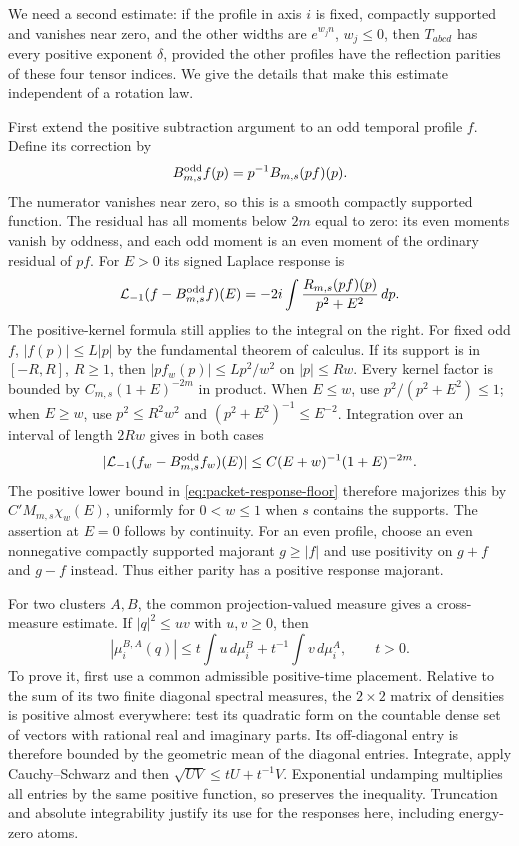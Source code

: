 We need a second estimate: if the profile in axis $i$ is fixed, compactly
supported and vanishes near zero, and the other widths are $e^{w_jn}$,
$w_j\leq0$, then $T_{abcd}$ has every positive exponent $\delta$, provided
the other profiles have the reflection parities of these four tensor indices.
We give the details that make this estimate independent of a rotation law.

First extend the positive subtraction argument to an odd temporal profile
$f$. Define its correction by
\[
 B^{\rm odd}_{m,s}f(p)=p^{-1}B_{m,s}(pf)(p).
\]
The numerator vanishes near zero, so this is a smooth compactly supported
function. The residual has all moments below $2m$ equal to zero: its even
moments vanish by oddness, and each odd moment is an even moment of the
ordinary residual of $pf$. For $E>0$ its signed Laplace response is
\[
 \mathcal L_{-1}(f-B^{\rm odd}_{m,s}f)(E)
       =-2i\int\frac{R_{m,s}(pf)(p)}{p^2+E^2}\,dp.
\]
The positive-kernel formula still applies to the integral on the right.
For fixed odd $f$, $|f(p)|\leq L|p|$ by the fundamental theorem of
calculus. If its support is in $[-R,R]$, $R\geq1$, then
$|p f_w(p)|\leq Lp^2/w^2$ on $|p|\leq Rw$.
Every kernel factor is bounded by
$C_{m,s}(1+E)^{-2m}$ in product. When $E\leq w$, use
$p^2/(p^2+E^2)\leq1$; when $E\geq w$, use
$p^2\leq R^2w^2$ and $(p^2+E^2)^{-1}\leq E^{-2}$.
Integration over an interval of length $2Rw$ gives in both cases
\[
 |\mathcal L_{-1}(f_w-B^{\rm odd}_{m,s}f_w)(E)|
 \leq C(E+w)^{-1}(1+E)^{-2m}.
\]
The positive lower bound in \eqref{eq:packet-response-floor} therefore
majorizes this by $C'M_{m,s}\chi_w(E)$, uniformly for $0<w\leq1$ when
$s$ contains the supports. The assertion at $E=0$ follows by continuity.
For an even profile, choose an even nonnegative compactly supported
majorant $g\geq|f|$ and use positivity on $g+f$ and $g-f$ instead.
Thus either parity has a positive response majorant.

For two clusters $A,B$, the common projection-valued measure gives a
cross-measure estimate. If $|q|^2\leq uv$ with $u,v\geq0$, then
\begin{equation}\label{eq:stress-cross-price}
 |\mu_i^{B,A}(q)|\leq t\int u\,d\mu_i^B
                       +t^{-1}\int v\,d\mu_i^A,\qquad t>0.
\end{equation}
To prove it, first use a common admissible positive-time placement.
Relative to the sum of its two finite diagonal spectral measures, the
$2\times2$ matrix of densities is positive almost everywhere: test its
quadratic form on the countable dense set of vectors with rational real
and imaginary parts. Its off-diagonal entry is therefore bounded by the
geometric mean of the diagonal entries. Integrate, apply Cauchy--Schwarz
and then $\sqrt{UV}\leq tU+t^{-1}V$. Exponential undamping multiplies all
entries by the same positive function, so preserves the inequality.
Truncation and absolute integrability justify its use for the responses
here, including energy-zero atoms.

